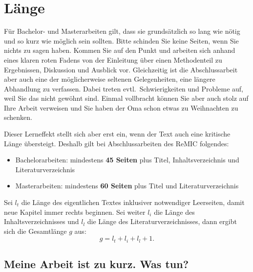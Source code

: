 \section{Länge}
\label{laenge}

Für Bachelor- und Masterarbeiten gilt, dass sie grundsätzlich so lang wie nötig und so kurz wie möglich sein sollten.
Bitte schinden Sie keine Seiten, wenn Sie nichts zu sagen haben.
Kommen Sie auf den Punkt und arbeiten sich anhand eines klaren roten Fadens von der Einleitung über einen Methodenteil zu Ergebnissen, Diskussion und Ausblick vor.
Gleichzeitig ist die Abschlussarbeit aber auch eine der möglicherweise seltenen Gelegenheiten, eine längere Abhandlung zu verfassen.
Dabei treten evtl.~Schwierigkeiten und Probleme auf, weil Sie das nicht gewöhnt sind.
Einmal vollbracht können Sie aber auch stolz auf Ihre Arbeit verweisen und Sie haben der Oma schon etwas zu Weihnachten zu schenken.

Dieser Lerneffekt stellt sich aber erst ein, wenn der Text auch eine kritische Länge übersteigt.
Deshalb gilt bei Abschlussarbeiten des ReMIC folgendes:
\begin{itemize}
\item Bachelorarbeiten: mindestens \textbf{45 Seiten} plus Titel, Inhaltsverzeichnis und Literaturverzeichnis
\item Masterarbeiten: mindestens \textbf{60 Seiten} plus Titel und Literaturverzeichnis
\end{itemize}
Sei $l_t$ die Länge des eigentlichen Textes inklusiver notwendiger Leerseiten, damit neue Kapitel immer rechts beginnen.
Sei weiter $l_i$ die Länge des Inhaltsverzeichnisses und  $l_l$ die Länge des Literaturverzeichnisses, dann ergibt sich die Gesamtlänge $g$ aus:
\begin{equation}
g = l_t + l_i + l_l + 1.
\label{gleichung laenge}
\end{equation}

\subsection{Meine Arbeit ist zu kurz. Was tun?}\label{zuKurz}

